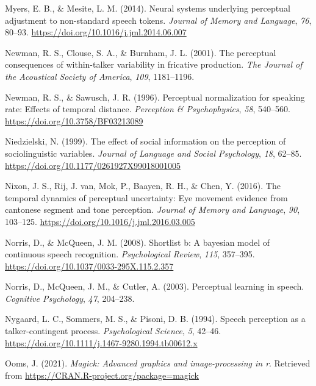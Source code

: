 \documentclass[
  11pt,
  man,floatsintext]{apa6}
\newlength{\cslhangindent}
\newlength{\cslentryspacingunit} %
\newenvironment{CSLReferences}[2] %
 {%
  \setlength{\parindent}{0pt}
  \ifodd #1
  \let\oldpar\par
  \def\par{\hangindent=\cslhangindent\oldpar}
  \fi
  \setlength{\parskip}{#2\cslentryspacingunit}
 }%
 {}
\begin{document}
\begin{CSLReferences}{1}{0}
\leavevmode{}%
Myers, E. B., \& Mesite, L. M. (2014). Neural systems underlying perceptual adjustment to non-standard speech tokens. \emph{Journal of Memory and Language}, \emph{76}, 80--93. \url{https://doi.org/10.1016/j.jml.2014.06.007}

\leavevmode{}%
Newman, R. S., Clouse, S. A., \& Burnham, J. L. (2001). The perceptual consequences of within-talker variability in fricative production. \emph{The Journal of the Acoustical Society of America}, \emph{109}, 1181--1196.

\leavevmode{}%
Newman, R. S., \& Sawusch, J. R. (1996). Perceptual normalization for speaking rate: Effects of temporal distance. \emph{Perception \& Psychophysics}, \emph{58}, 540--560. \url{https://doi.org/10.3758/BF03213089}

\leavevmode{}%
Niedzielski, N. (1999). The effect of social information on the perception of sociolinguistic variables. \emph{Journal of Language and Social Psychology}, \emph{18}, 62--85. \url{https://doi.org/10.1177/0261927X99018001005}

\leavevmode{}%
Nixon, J. S., Rij, J. van, Mok, P., Baayen, R. H., \& Chen, Y. (2016). The temporal dynamics of perceptual uncertainty: Eye movement evidence from cantonese segment and tone perception. \emph{Journal of Memory and Language}, \emph{90}, 103--125. \url{https://doi.org/10.1016/j.jml.2016.03.005}

\leavevmode{}%
Norris, D., \& McQueen, J. M. (2008). Shortlist b: A bayesian model of continuous speech recognition. \emph{Psychological Review}, \emph{115}, 357--395. \url{https://doi.org/10.1037/0033-295X.115.2.357}

\leavevmode{}%
Norris, D., McQueen, J. M., \& Cutler, A. (2003). Perceptual learning in speech. \emph{Cognitive Psychology}, \emph{47}, 204--238.

\leavevmode{}%
Nygaard, L. C., Sommers, M. S., \& Pisoni, D. B. (1994). Speech perception as a talker-contingent process. \emph{Psychological Science}, \emph{5}, 42--46. \url{https://doi.org/10.1111/j.1467-9280.1994.tb00612.x}

\leavevmode{}%
Ooms, J. (2021). \emph{Magick: Advanced graphics and image-processing in r}. Retrieved from \url{https://CRAN.R-project.org/package=magick}


\end{CSLReferences}
\end{document}
